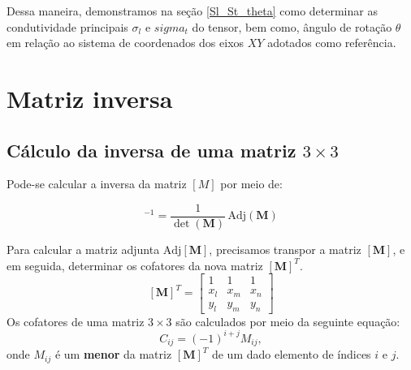 \documentclass[
12pt,
a4paper,
oneside,
chapter=TITLE,
sumario=tradicional
]{abntex2}
\begin{document}
Dessa maneira, demonstramos na seção \ref{Sl_St_theta} como determinar as condutividade principais $\sigma_l$ e $sigma_t$ do tensor, bem como, ângulo de rotação $\theta$ em relação ao sistema de coordenados dos eixos $XY$ adotados como referência.



%
%
%
%
%
%
%	
%			
%			
%	
\chapter{Matriz inversa} \label{App:matrizInversa}
\section*{Cálculo da inversa de uma matriz $3 \times 3$}
Pode-se calcular a inversa da matriz $[M]$ por meio de:

\begin{equation} %
	[\mathbf{M}]^{-1} = \frac{1}{\det(\mathbf{M})} \, \text{Adj}(\mathbf{M})
	\label{eq:A_003}
\end{equation}

Para calcular a matriz adjunta $\text{Adj}[\mathbf{M}]$, precisamos transpor a matriz $[\mathbf{M}]$, e em seguida, determinar os cofatores da nova matriz $[\mathbf{M}]^T$.
$$
[\mathbf{M}]^T =
\begin{bmatrix}
	1 & 1 & 1 \\
	x_l & x_m & x_n \\
	y_l & y_m & y_n
\end{bmatrix}
$$
Os cofatores de uma matriz $3 \times 3$ são calculados por meio da seguinte equação: 
$$
C_{ij} = (-1)^{i+j} M_{ij},
$$
onde $M_{ij}$ é um \textbf{menor} da matriz $[\mathbf{M}]^T$ de um dado elemento de índices $i$ e $j$.
\end{document}
